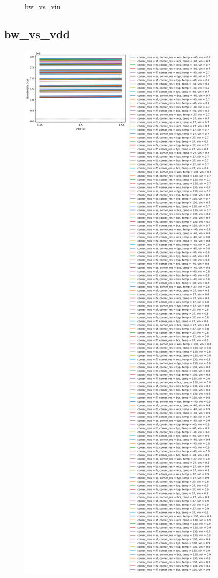 \documentclass[
  a4paper,
  DIV=11,
  numbers=noendperiod]{scrartcl}
\begin{document}
\begin{tcolorbox}
\begin{figure}[H]
{}

\caption{bw\_vs\_vin}

\end{figure}%

\subsection*{bw\_vs\_vdd}\label{bw_vs_vdd-1}

\begin{figure}[H]

{\centering \includegraphics{./cace/_docs/ota-improved/schematic/bw_vs_vdd.png}

}
\end{figure}
\end{tcolorbox}
\end{document}
